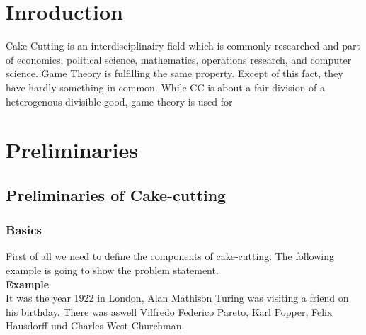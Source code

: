 


\section{Inroduction}
Cake Cutting is an interdisciplinairy field which is commonly researched and part of economics, political science, mathematics, operations research, and computer science. Game Theory is fulfilling the same property. Except of this fact, they have hardly something in common. While CC is about a fair division of a heterogenous divisible good, game theory is used for 
\pagebreak

\section{Preliminaries}
\subsection{Preliminaries of Cake-cutting}
\subsubsection{Basics}
First of all we need to define the components of cake-cutting. The following example is going to show the problem statement.\\
\textbf{Example}\\
It was the year 1922 in London, Alan Mathison Turing was visiting a friend on his birthday. There was aswell Vilfredo Federico Pareto, Karl Popper, Felix Hausdorff und Charles West Churchman.


